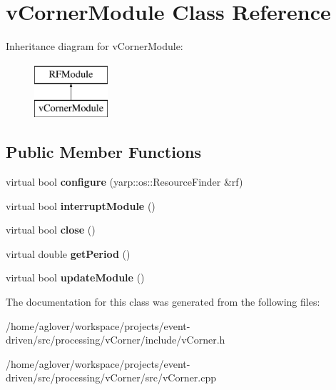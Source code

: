 \hypertarget{classvCornerModule}{}\section{v\+Corner\+Module Class Reference}
\label{classvCornerModule}
Inheritance diagram for v\+Corner\+Module\+:\begin{figure}[H]
\begin{center}
\leavevmode
\includegraphics[height=2.000000cm]{classvCornerModule}
\end{center}
\end{figure}
\subsection*{Public Member Functions}
\begin{DoxyCompactItemize}
\item 
virtual bool {\bfseries configure} (yarp\+::os\+::\+Resource\+Finder \&rf)\hypertarget{classvCornerModule_a9496d5d39d6b65dc048ce147ed2856d8}{}\label{classvCornerModule_a9496d5d39d6b65dc048ce147ed2856d8}

\item 
virtual bool {\bfseries interrupt\+Module} ()\hypertarget{classvCornerModule_a8354934bd0d851418e99d93c567f5020}{}\label{classvCornerModule_a8354934bd0d851418e99d93c567f5020}

\item 
virtual bool {\bfseries close} ()\hypertarget{classvCornerModule_aa66707b60e2f920a5faff5c13798b785}{}\label{classvCornerModule_aa66707b60e2f920a5faff5c13798b785}

\item 
virtual double {\bfseries get\+Period} ()\hypertarget{classvCornerModule_afc071a27e74fe3ab6d23a78b25844df4}{}\label{classvCornerModule_afc071a27e74fe3ab6d23a78b25844df4}

\item 
virtual bool {\bfseries update\+Module} ()\hypertarget{classvCornerModule_af25a4ba8a2b8346f0a3a69b6e80998c8}{}\label{classvCornerModule_af25a4ba8a2b8346f0a3a69b6e80998c8}

\end{DoxyCompactItemize}


The documentation for this class was generated from the following files\+:\begin{DoxyCompactItemize}
\item 
/home/aglover/workspace/projects/event-\/driven/src/processing/v\+Corner/include/v\+Corner.\+h\item 
/home/aglover/workspace/projects/event-\/driven/src/processing/v\+Corner/src/v\+Corner.\+cpp\end{DoxyCompactItemize}
